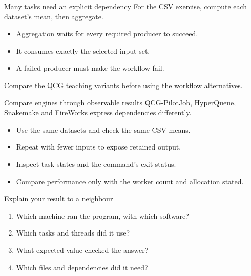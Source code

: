 \documentclass[aspectratio=169,11pt]{beamer}
\begin{document}
\begin{frame}{Many tasks need an explicit dependency}
For the CSV exercise, compute each dataset's mean, then aggregate.
\begin{itemize}
\item Aggregation waits for every required producer to succeed.
\item It consumes exactly the selected input set.
\item A failed producer must make the workflow fail.
\end{itemize}
Compare the QCG teaching variants before using the workflow alternatives.
\end{frame}
\begin{frame}{Compare engines through observable results}
QCG-PilotJob, HyperQueue, Snakemake and FireWorks express dependencies differently.
\begin{itemize}
\item Use the same datasets and check the same CSV means.
\item Repeat with fewer inputs to expose retained output.
\item Inspect task states and the command's exit status.
\item Compare performance only with the worker count and allocation stated.
\end{itemize}
\end{frame}
\begin{frame}{Explain your result to a neighbour}
\begin{enumerate}
\item Which machine ran the program, with which software?
\item Which tasks and threads did it use?
\item What expected value checked the answer?
\item Which files and dependencies did it need?
\end{enumerate}
\end{frame}
\appendix
\end{document}

